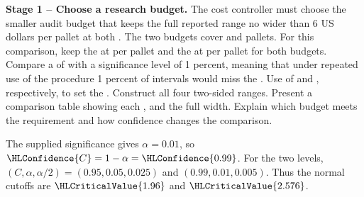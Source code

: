 \textbf{Stage 1 -- Choose a research budget.} The cost controller must choose the smaller audit budget that keeps the full reported range no wider than 6 US dollars per pallet at both . The two budgets cover  and  pallets. For this comparison, keep the   at  per pallet and the   at  per pallet for both budgets. Compare a  of  with a significance level of 1 percent, meaning that under repeated use of the procedure 1 percent of intervals would miss the . Use  of  and , respectively, to set the   . Construct all four two-sided ranges. Present a comparison table showing each ,  and the full width. Explain which budget meets the requirement and how confidence changes the comparison.
\par\endgroup

\begingroup
\setlength{\abovedisplayskip}{6pt}
\setlength{\belowdisplayskip}{6pt}
\setlength{\abovedisplayshortskip}{3pt}
\setlength{\belowdisplayshortskip}{4pt}
\setlength{\parskip}{4pt}

The supplied significance gives $\alpha=0.01$, so $\HLConfidence{C}=1-\alpha=\HLConfidence{0.99}$. For the two levels, $(C,\alpha,\alpha/2)=(0.95,0.05,0.025)$ and $(0.99,0.01,0.005)$. Thus the normal cutoffs are $\HLCriticalValue{1.96}$ and $\HLCriticalValue{2.576}$.

